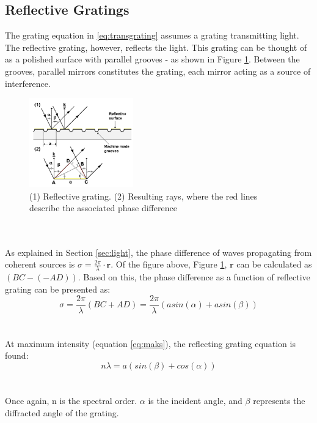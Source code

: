 \subsection{Reflective Gratings}
The grating equation in \ref{eq:transgrating} assumes a grating transmitting light. The reflective grating, however, reflects the light. This grating can be thought of as a polished surface with parallel grooves - as shown in Figure \ref{fig:refgrating}. Between the grooves, parallel mirrors constitutes the grating, each mirror acting as a source of interference. 
\begin{figure}[h]
    \centering
    \includegraphics[width=0.4\textwidth]{Images/theory/refgrating.png}
    \caption{(1) Reflective
grating. (2) Resulting rays, where the red lines describe the associated phase difference}
    \label{fig:refgrating}
\end{figure}
\\\\
As explained in Section \ref{sec:light}, the phase difference of waves propagating from coherent sources is $\sigma = \frac{2 \pi}{\lambda} \cdot \textbf{r}$. Of the figure above, Figure \ref{fig:refgrating}, $\textbf{r}$ can be calculated as $(BC - (-AD))$. Based on this, the phase difference as a function of reflective grating can be presented as:
\begin{equation}
    \sigma = \frac{2 \pi}{\lambda}(BC + AD) = \frac{2 \pi}{\lambda} (a sin(\alpha) + a sin(\beta))
\end{equation}
\\\\
At maximum intensity (equation \ref{eq:maks}), the reflecting grating equation is found:
\begin{equation}
    n \lambda = a (sin(\beta) + cos(\alpha))
    \label{eq:refgrating}
\end{equation}
\\\\
Once again, n is the spectral order. $\alpha$ is the incident angle, and $\beta$ represents the diffracted angle of the grating.
\\\\
